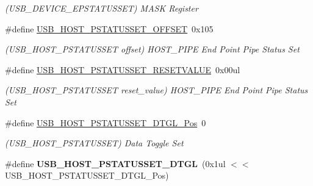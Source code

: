 \begin{DoxyCompactItemize}
\begin{DoxyCompactList}\small\item\em (U\+S\+B\+\_\+\+D\+E\+V\+I\+C\+E\+\_\+\+E\+P\+S\+T\+A\+T\+U\+S\+S\+E\+T) M\+A\+S\+K Register \end{DoxyCompactList}\item 
\hypertarget{group___s_a_m_l21___u_s_b_gaf96e2e0fc5fd241cafedc0b434ca113e}{}\#define \hyperlink{group___s_a_m_l21___u_s_b_gaf96e2e0fc5fd241cafedc0b434ca113e}{U\+S\+B\+\_\+\+H\+O\+S\+T\+\_\+\+P\+S\+T\+A\+T\+U\+S\+S\+E\+T\+\_\+\+O\+F\+F\+S\+E\+T}~0x105\label{group___s_a_m_l21___u_s_b_gaf96e2e0fc5fd241cafedc0b434ca113e}

\begin{DoxyCompactList}\small\item\em (U\+S\+B\+\_\+\+H\+O\+S\+T\+\_\+\+P\+S\+T\+A\+T\+U\+S\+S\+E\+T offset) H\+O\+S\+T\+\_\+\+P\+I\+P\+E End Point Pipe Status Set \end{DoxyCompactList}\item 
\hypertarget{group___s_a_m_l21___u_s_b_ga613399fd9ee1b39ba68a640af1ef4717}{}\#define \hyperlink{group___s_a_m_l21___u_s_b_ga613399fd9ee1b39ba68a640af1ef4717}{U\+S\+B\+\_\+\+H\+O\+S\+T\+\_\+\+P\+S\+T\+A\+T\+U\+S\+S\+E\+T\+\_\+\+R\+E\+S\+E\+T\+V\+A\+L\+U\+E}~0x00ul\label{group___s_a_m_l21___u_s_b_ga613399fd9ee1b39ba68a640af1ef4717}

\begin{DoxyCompactList}\small\item\em (U\+S\+B\+\_\+\+H\+O\+S\+T\+\_\+\+P\+S\+T\+A\+T\+U\+S\+S\+E\+T reset\+\_\+value) H\+O\+S\+T\+\_\+\+P\+I\+P\+E End Point Pipe Status Set \end{DoxyCompactList}\item 
\hypertarget{group___s_a_m_l21___u_s_b_ga9c9b367ddba557817552ec11a6c0b0d0}{}\#define \hyperlink{group___s_a_m_l21___u_s_b_ga9c9b367ddba557817552ec11a6c0b0d0}{U\+S\+B\+\_\+\+H\+O\+S\+T\+\_\+\+P\+S\+T\+A\+T\+U\+S\+S\+E\+T\+\_\+\+D\+T\+G\+L\+\_\+\+Pos}~0\label{group___s_a_m_l21___u_s_b_ga9c9b367ddba557817552ec11a6c0b0d0}

\begin{DoxyCompactList}\small\item\em (U\+S\+B\+\_\+\+H\+O\+S\+T\+\_\+\+P\+S\+T\+A\+T\+U\+S\+S\+E\+T) Data Toggle Set \end{DoxyCompactList}\item 
\hypertarget{group___s_a_m_l21___u_s_b_ga9660d473e4dc92b8b0829d851f60180a}{}\#define {\bfseries U\+S\+B\+\_\+\+H\+O\+S\+T\+\_\+\+P\+S\+T\+A\+T\+U\+S\+S\+E\+T\+\_\+\+D\+T\+G\+L}~(0x1ul $<$$<$ U\+S\+B\+\_\+\+H\+O\+S\+T\+\_\+\+P\+S\+T\+A\+T\+U\+S\+S\+E\+T\+\_\+\+D\+T\+G\+L\+\_\+\+Pos)\label{group___s_a_m_l21___u_s_b_ga9660d473e4dc92b8b0829d851f60180a}


\end{DoxyCompactItemize}
